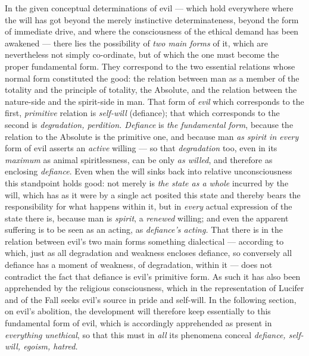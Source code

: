 \documentclass[12pt,a4paper]{book}
\begin{document}
In the given conceptual determinations of evil --- which hold everywhere where
the will has got beyond the merely instinctive determinateness, beyond the form
of immediate drive, and where the consciousness of the ethical demand has been
awakened --- there lies the possibility of \emph{two main forms} of it, which
are nevertheless not simply co-ordinate, but of which the one must become the
proper fundamental form. They correspond to the two essential relations whose
normal form constituted the good: the relation between man as a member of the
totality and the principle of totality, the Absolute, and the relation between
the nature-side and the spirit-side in man. That form of \emph{evil} which
corresponds to the first, \emph{primitive} relation is \emph{self-will}
(defiance); that which corresponds to the second is \emph{degradation,
perdition. Defiance} is \emph{the fundamental form}, because the relation to the
Absolute is the primitive one, and because man \emph{as spirit in every} form of
evil asserts an \emph{active} willing --- so that \emph{degradation} too, even
in its \emph{maximum} as animal spiritlessness, can be only \emph{as willed},
and therefore as enclosing \emph{defiance}. Even when the will sinks back into
relative unconsciousness this standpoint holds good: not merely is \emph{the
state as a whole} incurred by the will, which has as it were by a single act
posited this state and thereby bears the responsibility for what happens within
it, but in \emph{every} actual expression of the state there is, because man is
\emph{spirit}, a \emph{renewed} willing; and even
the apparent suffering is to be seen as an acting, as \emph{defiance's acting.}
That there is in the relation between evil's two main forms something
dialectical --- according to which, just as all degradation and weakness
encloses defiance, so conversely all defiance has a moment of weakness, of
degradation, within it --- does not contradict the fact that defiance is evil's
primitive form. As such it has also been apprehended by the religious
consciousness, which in the representation of Lucifer and of the Fall seeks
evil's source in pride and self-will. In the following section, on evil's
abolition, the development will therefore keep essentially to this fundamental
form of evil, which is accordingly apprehended as present in \emph{everything
unethical}, so that this must in \emph{all} its phenomena conceal
\emph{defiance, self-will, egoism, hatred.}
\end{document}

